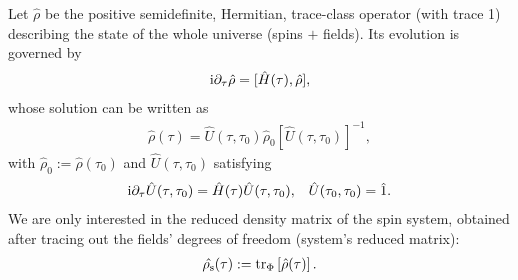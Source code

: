\documentclass[]{nature}
\begin{document}
Let
$\hat{\rho}$ be the positive semidefinite, Hermitian, trace-class operator (with trace 1)  describing the state of the whole universe (spins $+$ fields). Its evolution is governed by 
\begin{eqnarray}
{\rm i}\partial_\tau \hat{\rho} = [\hat{H}(\tau),\hat{\rho}],
\label{drhodt}
\end{eqnarray}
whose solution can be written as
\begin{eqnarray}
\hat{\rho}(\tau) = \hat{U}(\tau,\tau_0) \hat{\rho}_0 [\hat{U}(\tau,\tau_0)]^{-1},
\label{rhoevol}
\end{eqnarray}
with $\hat{\rho}_0 := \hat{\rho}(\tau_0)$ and $\hat{U}(\tau,\tau_0)$ satisfying
\begin{eqnarray}
{\rm i}\partial_\tau\hat{U}(\tau,\tau_0)= \hat{H}(\tau) \hat{U}(\tau,\tau_0), \;\;\;\hat{U}(\tau_0,\tau_0)=\hat 1. 
\label{U}
\end{eqnarray}
We are only interested in the reduced density matrix of the spin system, obtained after tracing out the fields' degrees of freedom (system's reduced matrix):
\begin{eqnarray}
\hat{\rho_{\rm s}}(\tau) := {\rm tr}_\Phi \left[\hat{\rho}(\tau) \right].
\label{rhos}
\end{eqnarray}
\end{document}
